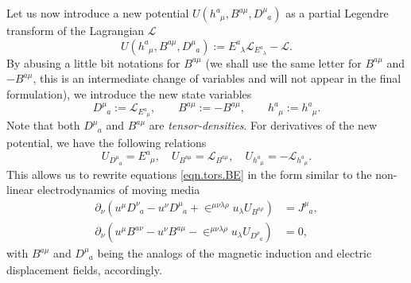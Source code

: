 \documentclass[
10pt, %
a4paper, %
oneside, %
twocolumn,
headinclude,footinclude, %
BCOR5mm, %
]{scrartcl}
\newcommand{\tetrsymbol}{h}
\newcommand{\tetr}[2]{\tetrsymbol^{#1}_{\phantom{#1}#2}}
\newcommand{\D}[1]{\partial_{#1}} %
\newcommand{\ET}[2]{E^{#1}_{\phantom{#1}#2}}	%
\newcommand{\Dm}[2]{D_{\phantom{#2}#1}^{#2}}	%
\newcommand{\BT}[2]{B^{#1#2}}	%
\newcommand{\Bm}[2]{B^{#1#2}}	%
\newcommand{\LagBE}{\mathcal{L}}%
\newcommand{\Um}{U}%
\newcommand{\LCsymb}{\bm{\in}}    %
\newcommand{\NC}[2]{J^{#2}_{\phantom{#2}#1}}
\begin{document}
	Let us now introduce a new potential $ \Um(\tetr{a}{\mu},\Bm{a}{\mu},\Dm{a}{\mu}) $ as a 
	partial 
	Legendre transform of the Lagrangian $ \LagBE $
	\begin{equation}\label{eqn.Legendre1}
		\Um(\tetr{a}{\mu},\Bm{a}{\mu},\Dm{a}{\mu}) := \ET{a}{\lambda}\LagBE_{\ET{a}{\lambda}} - 
		\LagBE.
	\end{equation}
	By abusing a little bit notations for $ \BT{a}{\mu} $ (we shall use the same letter for $ 
	\BT{a}{\mu} $ and $ -\Bm{a}{\mu} $, this is an intermediate change 
	of variables and will not appear in the final formulation), we introduce the new state variables
	\begin{equation}\label{eqn.Legendre2}
		\Dm{a}{\mu} := \LagBE_{\ET{a}{\mu}}, \qquad \Bm{a}{\mu} := -\BT{a}{\mu}, \qquad 
		\tetr{a}{\mu} := \tetr{a}{\mu}.
	\end{equation}
	Note 
	that both $ \Dm{a}{\mu} $ and $ \Bm{a}{\mu} $ are 
	\emph{tensor-densities}. For derivatives of the new potential, we have the following relations
	\begin{equation}\label{eqn.Legendre3}
		\Um_{\Dm{a}{\mu}} = \ET{a}{\mu}, \quad \Um_{\Bm{a}{\mu}} = \LagBE_{\BT{a}{\mu}},
		\quad \Um_{\tetr{a}{\mu}} = - \LagBE_{\tetr{a}{\mu}}.
	\end{equation}
	This allows us to rewrite equations \eqref{eqn.tors.BE} in 
	the form similar to the non-linear 
	electrodynamics of moving media~\cite{Obukhov2008,DPRZ2017,Hohmann2018a}
	\begin{subequations}
		\begin{align}
			\D{\nu}(u^\mu\Dm{a}{\nu} - u^\nu \Dm{a}{\mu} + 
			\LCsymb^{\mu\nu\lambda\rho}u_\lambda 
			\Um_{\Bm{a}{\rho}})
			& =	\NC{a}{\mu},\\[2mm]
			\D{\nu}(u^\mu \Bm{a}{\nu} - u^\nu \Bm{a}{\mu} - 
			\LCsymb^{\mu\nu\lambda\rho}u_\lambda 
			\Um_{\Dm{a}{\rho}}) 
			& = 0,
		\end{align}
	\end{subequations}
	with $\Bm{a}{\mu}$ and $\Dm{a}{\mu}$ being the analogs of the magnetic induction and
	electric displacement fields, accordingly.
	
\end{document}
